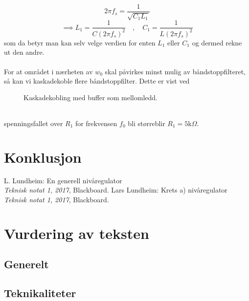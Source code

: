 \documentclass[a4paper,11pt,norsk]{article}
\newcommand{\comma}{\quad , \quad}
\begin{document}
    $$2\pi f_s = \frac{1}{\sqrt{C_1 L_1}}$$
\begin{equation}
    \implies L_1 = \frac{1}{C (2 \pi f_s)^2} \comma C_1 = \frac{1}{L (2\pi f_s)^2}
\end{equation}\label{eq:resonnans}
som da betyr man kan selv velge verdien for enten $L_1$ eller $C_1$ og dermed rekne ut den andre. \\
\\
For at området i nærheten av $w_0$ skal påvirkes minst mulig av båndstoppfilteret, så kan vi kaskadekoble flere båndstoppfilter. Dette er vist ved
\begin{figure}[htbp]
    \centering
    
    \caption{Kaskadekobling med buffer som mellomledd.}
  \label{fig:kaskadekobling}
\end{figure}
\\

spenningsfallet over $R_1$ for  frekvensen $f_0$  bli størreblir  $R_1 = 5$k$\Omega$.

\newpage
\section{Konklusjon}
\label{sec:konklusjon}

\newpage

\begin{thebibliography}{9}

L. Lundheim: En generell nivåregulator \\
\textit{Teknisk notat 1, 2017}, Blackboard.
Lars Lundheim: Krets a) nivåregulator \\
\textit{Teknisk notat 1, 2017}, Blackboard.
\end{thebibliography}

\section{Vurdering av teksten}
\subsection{Generelt}
\begin{itemize}

\end{itemize}

\subsection{Teknikaliteter}
\begin{itemize}

\end{itemize}
\end{document}

